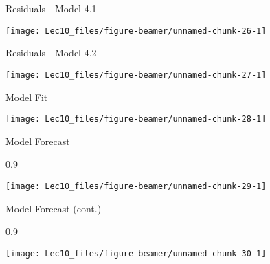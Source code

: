 \documentclass[11pt,ignorenonframetext,]{beamer}
\newenvironment{Shaded}{}{}
\newcommand{\DataTypeTok}[1]{\textcolor[rgb]{0.56,0.13,0.00}{#1}}
\newcommand{\DecValTok}[1]{\textcolor[rgb]{0.25,0.63,0.44}{#1}}
\newcommand{\FloatTok}[1]{\textcolor[rgb]{0.25,0.63,0.44}{#1}}
\newcommand{\KeywordTok}[1]{\textcolor[rgb]{0.00,0.44,0.13}{\textbf{#1}}}
\newcommand{\NormalTok}[1]{#1}
\newcommand{\OperatorTok}[1]{\textcolor[rgb]{0.40,0.40,0.40}{#1}}
\newcommand{\StringTok}[1]{\textcolor[rgb]{0.25,0.44,0.63}{#1}}
\let\oldShaded\Shaded
\let\endoldShaded\endShaded
\renewenvironment{Shaded}{\footnotesize\begin{spacing}{0.9}\oldShaded}{\endoldShaded\end{spacing}}
\begin{document}
\begin{frame}{Residuals - Model 4.1}
\protect\hypertarget{residuals---model-4.1}{}

\begin{center}\texttt{[image: Lec10\_files/figure-beamer/unnamed-chunk-26-1]} \end{center}

\end{frame}

\begin{frame}{Residuals - Model 4.2}
\protect\hypertarget{residuals---model-4.2}{}

\begin{center}\texttt{[image: Lec10\_files/figure-beamer/unnamed-chunk-27-1]} \end{center}

\end{frame}

\begin{frame}{Model Fit}
\protect\hypertarget{model-fit}{}

\begin{center}\texttt{[image: Lec10\_files/figure-beamer/unnamed-chunk-28-1]} \end{center}

\end{frame}

\begin{frame}[fragile]{Model Forecast}
\protect\hypertarget{model-forecast}{}

\begin{Shaded}
\end{Shaded}

\begin{center}\texttt{[image: Lec10\_files/figure-beamer/unnamed-chunk-29-1]} \end{center}

\end{frame}

\begin{frame}[fragile]{Model Forecast (cont.)}
\protect\hypertarget{model-forecast-cont.}{}

\begin{Shaded}
\end{Shaded}

\begin{center}\texttt{[image: Lec10\_files/figure-beamer/unnamed-chunk-30-1]} \end{center}

\end{frame}
\end{document}
